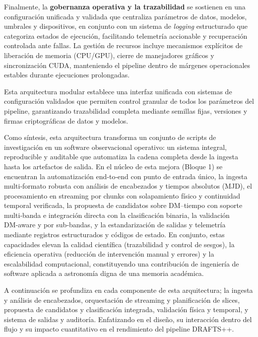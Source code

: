 Finalmente, la \textbf{gobernanza operativa y la trazabilidad} se sostienen en una configuración unificada y validada  que centraliza parámetros de datos, modelos, umbrales y dispositivos, en conjunto con un sistema de \emph{logging} estructurado que categoriza estados de ejecución, facilitando telemetría accionable y recuperación controlada ante fallas. La gestión de recursos incluye mecanismos explícitos de liberación de memoria (CPU/GPU), cierre de manejadores gráficos y sincronización CUDA, manteniendo el pipeline dentro de márgenes operacionales estables durante ejecuciones prolongadas.

Esta arquitectura modular establece una interfaz unificada con sistemas de configuración validados que permiten control granular de todos los parámetros del pipeline, garantizando trazabilidad completa mediante semillas fijas, versiones y firmas criptográficas de datos y modelos.

Como síntesis, esta arquitectura transforma un conjunto de scripts de investigación en un software observacional operativo: un sistema integral, reproducible y auditable que automatiza la cadena completa desde la ingesta hasta los artefactos de salida. En el núcleo de esta mejora (Bloque 1) se encuentran la automatización end‑to‑end con punto de entrada único, la ingesta multi‑formato robusta con análisis de encabezados y tiempos absolutos (MJD), el procesamiento en streaming por chunks con solapamiento físico y continuidad temporal verificada, la propuesta de candidatos sobre DM–tiempo con soporte multi‑banda e integración directa con la clasificación binaria, la validación DM‑aware y por sub‑bandas, y la estandarización de salidas y telemetría mediante registros estructurados y códigos de estado. En conjunto, estas capacidades elevan la calidad científica (trazabilidad y control de sesgos), la eficiencia operativa (reducción de intervención manual y errores) y la escalabilidad computacional, constituyendo una contribución de ingeniería de software aplicada a astronomía digna de una memoria académica.

A continuación se profundiza en cada componente de esta arquitectura; la ingesta y análisis de encabezados, orquestación de streaming y planificación de slices, propuesta de candidatos y clasificación integrada, validación física y temporal, y sistema de salidas y auditoría. Enfatizando en el diseño, su interacción dentro del flujo y su impacto cuantitativo en el rendimiento del pipeline DRAFTS++.



